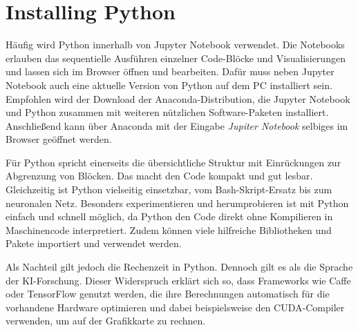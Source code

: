 %
%


\chapter{Installing Python}


Häufig wird Python innerhalb von Jupyter Notebook verwendet. Die Notebooks erlauben das sequentielle Ausführen einzelner Code-Blöcke und Visualisierungen und lassen sich im Browser öffnen und bearbeiten. Dafür muss neben Jupyter Notebook auch eine aktuelle Version von Python auf dem PC installiert sein. Empfohlen wird der Download der Anaconda-Distribution, die Jupyter Notebook und Python zusammen mit weiteren nützlichen Software-Paketen installiert. Anschließend kann über Anaconda mit der Eingabe \textsl{Jupiter Notebook} selbiges im Browser geöffnet werden.

Für Python spricht einerseits die übersichtliche Struktur mit Einrückungen zur Abgrenzung von Blöcken. Das macht den Code kompakt und gut lesbar. Gleichzeitig ist Python vielseitig einsetzbar, vom Bash-Skript-Ersatz bis zum neuronalen Netz. Besonders experimentieren und herumprobieren ist mit Python einfach und schnell möglich, da Python den Code direkt ohne Kompilieren in Maschinencode interpretiert. Zudem können viele hilfreiche Bibliotheken und Pakete  importiert und verwendet werden.

Als Nachteil gilt jedoch die Rechenzeit in Python. Dennoch gilt es als die Sprache der KI-Forschung. Dieser Widerspruch erklärt sich so, dass Frameworks wie Caffe oder TensorFlow genutzt werden, die \glqq ihre Berechnungen automatisch für die vorhandene Hardware optimieren und dabei beispielsweise den CUDA-Compiler verwenden, um auf der Grafikkarte zu rechnen.\grqq \cite{Heise:2020}


